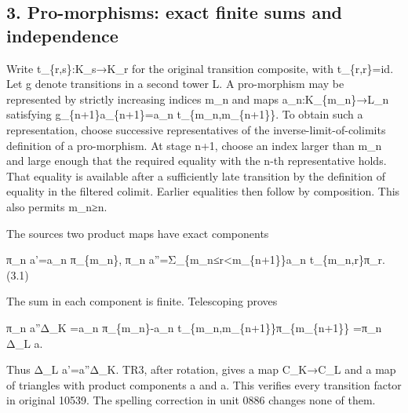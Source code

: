 \subsection{\texorpdfstring{3. Pro-morphisms:\allowbreak{} exact finite sums and independence}{3.  exact finite sums and independence}}\label{proofs-10435-10686-pro-morphisms-exact-finite-sums-and-independence}

Write t\_\allowbreak{}\{r,\allowbreak{}s\}:\allowbreak{}K\_\allowbreak{}s\allowbreak{}→K\_\allowbreak{}r for the original transition composite,\allowbreak{} with t\_\allowbreak{}\{r,\allowbreak{}r\}\allowbreak{}=id. Let g denote transitions in a second tower L. A pro-morphism may be represented by strictly increasing indices m\_\allowbreak{}n and maps a\_\allowbreak{}n:\allowbreak{}K\_\allowbreak{}\{m\_\allowbreak{}n\}\allowbreak{}→L\_\allowbreak{}n satisfying g\_\allowbreak{}\{n\allowbreak{}+1\}a\_\allowbreak{}\{n\allowbreak{}+1\}\allowbreak{}=a\_\allowbreak{}n t\_\allowbreak{}\{m\_\allowbreak{}n,\allowbreak{}m\_\allowbreak{}\{n\allowbreak{}+1\}\}. To obtain such a representation,\allowbreak{} choose successive representatives of the inverse-limit-of-colimits definition of a pro-morphism. At stage n\allowbreak{}+1,\allowbreak{} choose an index larger than m\_\allowbreak{}n and large enough that the required equality with the n-th representative holds. That equality is available after a sufficiently late transition by the definition of equality in the filtered colimit. Earlier equalities then follow by composition. This also permits m\_\allowbreak{}n≥n.

The source\textquotesingle s two product maps have exact components

π\_\allowbreak{}n a'\allowbreak{}=a\_\allowbreak{}n π\_\allowbreak{}\{m\_\allowbreak{}n\},\allowbreak{} π\_\allowbreak{}n a''\allowbreak{}=Σ\_\allowbreak{}\{m\_\allowbreak{}n≤r<m\_\allowbreak{}\{n\allowbreak{}+1\}\}a\_\allowbreak{}n t\_\allowbreak{}\{m\_\allowbreak{}n,\allowbreak{}r\}π\_\allowbreak{}r. (3.1)\allowbreak{}

The sum in each component is finite. Telescoping proves

π\_\allowbreak{}n a''Δ\_\allowbreak{}K \allowbreak{}=a\_\allowbreak{}n π\_\allowbreak{}\{m\_\allowbreak{}n\}-a\_\allowbreak{}n t\_\allowbreak{}\{m\_\allowbreak{}n,\allowbreak{}m\_\allowbreak{}\{n\allowbreak{}+1\}\}π\_\allowbreak{}\{m\_\allowbreak{}\{n\allowbreak{}+1\}\} \allowbreak{}=π\_\allowbreak{}n Δ\_\allowbreak{}L a\textquotesingle.

Thus Δ\_\allowbreak{}L a'\allowbreak{}=a''Δ\_\allowbreak{}K. TR3,\allowbreak{} after rotation,\allowbreak{} gives a map C\_\allowbreak{}K\allowbreak{}→C\_\allowbreak{}L and a map of triangles with product components a\textquotesingle{} and a\textquotesingle\textquotesingle. This verifies every transition factor in original 10539. The spelling correction in unit 0886 changes none of them.

